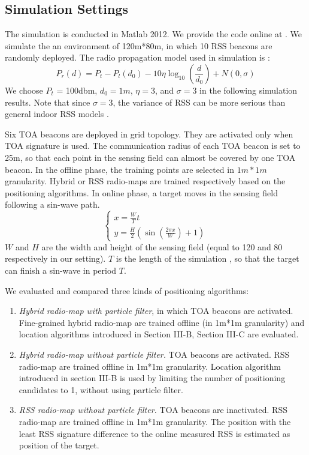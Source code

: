 \documentclass[conference, 10pt]{IEEEtran}
\begin{document}
\subsection{Simulation Settings}
The simulation is conducted in Matlab 2012. We provide the code online at \cite{yc}. We simulate the an environment of 120m*80m, in which 10 RSS beacons are randomly deployed. The radio propagation model used in simulation is \cite{lo_adaptive_2012}:
\begin{equation}
{P_r}(d) = {P_t} - {P_l}({d_0}) - 10\eta {\log _{10}}\left( {\frac{d}{{{d_0}}}} \right) + N\left( {0,\sigma } \right)
\end{equation}
We choose $P_{t}$ = 100dbm, $d_{0}=1m$, $\eta=3$, and   $\sigma=3$ in the following simulation results.  Note that since $\sigma=3$,  the variance of RSS can be more serious than general indoor RSS models \cite{bahl_radar:_2000}. 
 
Six TOA beacons are deployed in grid topology. They are activated only when TOA signature is used. The communication radius of each TOA beacon is set to 25m, so that each point in the sensing field can almost be covered by one TOA beacon.  In the offline phase, the training points are selected in $1m*1m$ granularity. Hybrid or RSS radio-maps are trained respectively based on the positioning algorithms.  In online phase, a target moves in the sensing field following a sin-wave path. 
\begin{equation}
\left\{ {\begin{array}{*{20}{l}}
{x = \frac{W}{T}t}\\
{y = \frac{H}{2}\left( {\sin \left( {\frac{{2\pi x}}{W}} \right) + 1} \right)}
\end{array}} \right.
\end{equation}
$W $ and $H$ are the width and height of the sensing field (equal to 120 and 80 respectively in our setting). $T$ is the length of the simulation , so that the target can finish a sin-wave in period $T$. 
 
We evaluated and compared three kinds of positioning algorithms:
\begin{enumerate}
\item \emph{Hybrid radio-map with particle filter}, in which TOA beacons are activated. Fine-grained hybrid radio-map are trained offline (in 1m*1m granularity) and location algorithms introduced in Section III-B, Section III-C are evaluated. 
\item \emph{Hybrid radio-map without particle filter.}  TOA beacons are activated. RSS radio-map are trained offline in 1m*1m granularity. Location algorithm introduced in section III-B is used by limiting the number of positioning candidates to 1, without using particle filter.  
\item \emph{RSS radio-map without particle filter. } TOA beacons are inactivated. RSS radio-map are trained offline in 1m*1m granularity. The position with the least RSS signature difference to the online measured RSS is estimated as position of the target. 
\end{enumerate}
\end{document}
